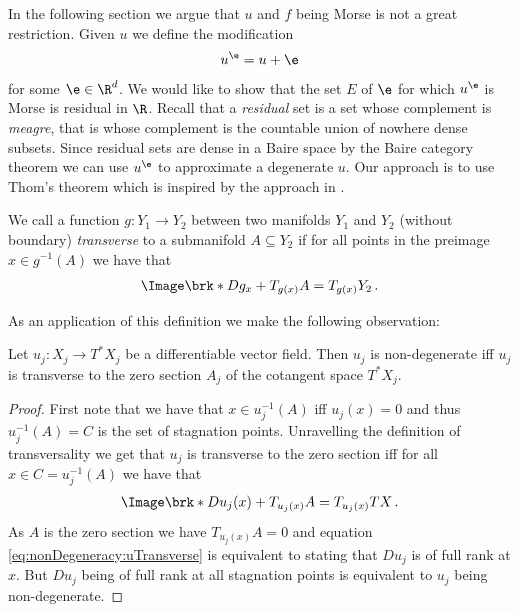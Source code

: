 In the following section we argue that 
$u$ and $f$ being Morse is not a great restriction.
Given $u$ we define the modification
\begin{align}
  u^\e=u+\e\label{eq:nonDegeneracy:definitionUEps}
\end{align}
for some $\e\in\R^d$. We would like to show that the set $E$ of $\e$ for which $u^\e$ is Morse
is residual in $\R$.
Recall that a \emph{residual} set is a set whose complement is \emph{meagre}, that is whose complement
is the countable union of nowhere dense subsets.
Since residual sets are dense in a Baire space by the Baire category theorem we can 
use $u^\e$ to approximate a degenerate $u$.
Our approach is to use Thom's theorem which is inspired by the approach in \cite[Chapter 6]{Hirsch1994}.
\begin{definition}
  We call a function $g\colon Y_1\to Y_2$ between two manifolds $Y_1$ and $Y_2$ (without boundary)
  \emph{transverse} to a submanifold $A\subseteq Y_2$ if for all points in the 
  preimage $x\in g^{-1}(A)$ we have that
  \begin{align*}
    \Image\brk*{Dg_x}+T_{g(x)}A = T_{g(x)}Y_2\,.
  \end{align*}
\end{definition}
As an application of this definition we make the following observation:
\begin{proposition}\label{pr:nonDegeneracy:alternativeCharacterisation}
  Let $u_j\colon X_j\to T^*X_j$ be a differentiable vector field.
  Then $u_j$ is non-degenerate iff $u_j$ is transverse to the zero section $A_j$ of the cotangent space $T^*X_j$.
\end{proposition}
\begin{proof}
  First note that we have that $x\in u_j^{-1}(A)$ iff $u_j(x)=0$ and thus $u_j^{-1}(A)=C$ is the set of stagnation points.
  Unravelling the definition of transversality we get that $u_j$ is transverse to the zero section iff for all $x\in C=u_j^{-1}(A)$
  we have that
  \begin{align}
    \Image\brk*{Du_j(x)}+T_{u_j(x)}A = T_{u_j(x)}TX\,. \label{eq:nonDegeneracy:uTransverse}
  \end{align}
  As $A$ is the zero section we have $T_{u_j(x)}A=0$ and equation \eqref{eq:nonDegeneracy:uTransverse}
  is equivalent to stating that $Du_j$ is of full rank at $x$. But $Du_j$ being of full rank at all stagnation points
  is equivalent to $u_j$ being non-degenerate.
\end{proof}
